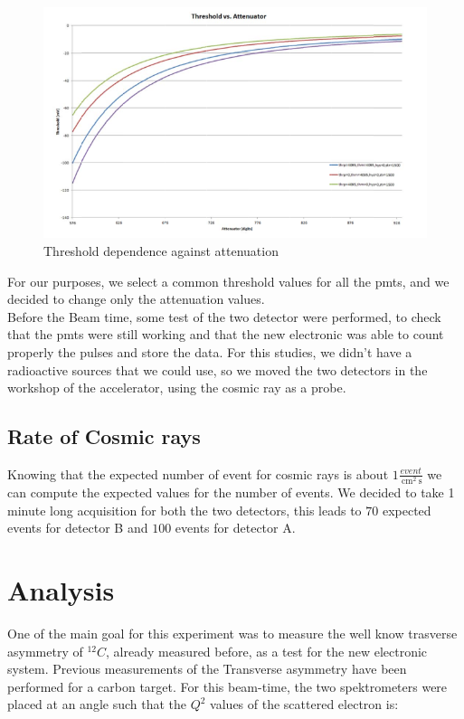 \begin{figure}[hbtp]
 \centering
 \includegraphics[scale=0.4]{Analysis/ThrvsAtt.png}
 \caption{Threshold dependence against attenuation}
 \end{figure}

For our purposes, we select a common threshold values for all the pmts, and we decided to change only the attenuation values.\\
Before the Beam time, some test of the two detector were performed, to check that the pmts were still working and that the new electronic was able to count properly the pulses and store the data. For this studies, we didn't have a radioactive sources that we could use, so we moved the two detectors in the workshop of the accelerator, using the cosmic ray as a probe.

\subsection{Rate of Cosmic rays}

Knowing that the expected number of event for cosmic rays is about $1 \frac{event}{\SI{}{\centi \meter\squared} \SI{}{\second}}$ we can compute the expected values for the number of events. We decided to take 1 minute long acquisition for both the two detectors, this leads to $70$ expected events for detector B  and  $100$ events for detector A.  


\section{Analysis}

One of the main goal for this experiment was to measure the well know trasverse asymmetry of $^{12}C$, already measured before, as a test for the new electronic system. Previous measurements of the Transverse asymmetry have been performed for a carbon target. For this beam-time, the two spektrometers were placed at an angle such that the $Q^{2}$ values of the scattered electron is:

